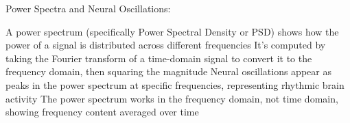 Power Spectra and Neural Oscillations:

A power spectrum (specifically Power Spectral Density or PSD) shows how the power of a signal is distributed across different frequencies
It's computed by taking the Fourier transform of a time-domain signal to convert it to the frequency domain, then squaring the magnitude
Neural oscillations appear as peaks in the power spectrum at specific frequencies, representing rhythmic brain activity
The power spectrum works in the frequency domain, not time domain, showing frequency content averaged over time